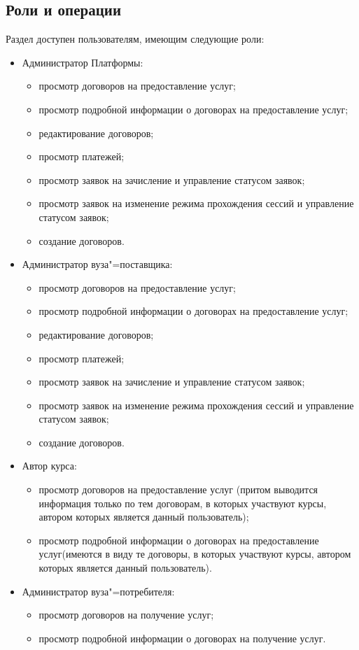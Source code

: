 \subsection{Роли и операции}
Раздел доступен пользователям, имеющим следующие роли:	
	\begin{itemize}
		\item Администратор Платформы:
		\begin{itemize}
			\item просмотр договоров на предоставление услуг;
			\item просмотр подробной информации о договорах на предоставление услуг;
			\item редактирование договоров;
			\item просмотр платежей;
			\item просмотр заявок на зачисление и управление статусом заявок;
			\item просмотр заявок на изменение режима прохождения сессий и управление статусом заявок;
			\item создание договоров.
		\end{itemize}
		\item Администратор вуза"=поставщика:
		\begin{itemize}
			\item просмотр договоров на предоставление услуг;
			\item просмотр подробной информации о договорах на предоставление услуг;
			\item редактирование договоров;
			\item просмотр платежей;
			\item просмотр заявок на зачисление и управление статусом заявок;
			\item просмотр заявок на изменение режима прохождения сессий и управление статусом заявок;
			\item создание договоров.
		\end{itemize}
		\item Автор курса:
		\begin{itemize}
			\item просмотр договоров на предоставление услуг (притом выводится информация только по тем договорам, в которых участвуют курсы, автором которых является данный пользователь);
			\item просмотр подробной информации о договорах на предоставление услуг(имеются в виду те договоры, в которых участвуют курсы, автором которых является данный пользователь).
		\end{itemize}				
		\item Администратор вуза"=потребителя:
		\begin{itemize}
			\item просмотр договоров на получение услуг;
			\item просмотр подробной информации о договорах на получение услуг.
		\end{itemize}				
	\end{itemize} 
	
